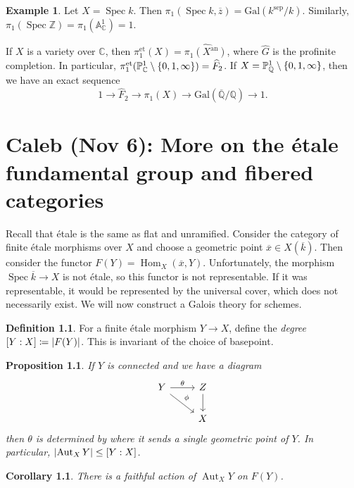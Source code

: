 \documentclass[leqno, openany]{memoir}
\newtheorem{cor}[thm]{Corollary}
\newtheorem{prop}[thm]{Proposition}
\theoremstyle{definition}
\newtheorem{defn}[thm]{Definition}
\newtheorem{exm}[thm]{Example}
\theoremstyle{remark}
\theoremstyle{plain}
\theoremstyle{definition}
\theoremstyle{remark}
\newcommand{\A}{\mathbb{A}}
\newcommand{\C}{\mathbb{C}}
\newcommand{\Z}{\mathbb{Z}}
\newcommand{\Q}{\mathbb{Q}}
\renewcommand{\P}{\mathbb{P}}
\newcommand{\mr}[1]{\mathrm{#1}}
\newcommand{\ol}[1]{\overline{#1}}
\newcommand{\wh}[1]{\widehat{#1}}
\DeclareMathOperator{\Hom}{Hom}
\DeclareMathOperator{\Aut}{Aut}
\DeclareMathOperator{\Spec}{Spec}
\begin{document}
\begin{exm}
    Let $X = \Spec k$. Then $\pi_1(\Spec k, \ol{z}) = \mr{Gal}(k^{\mr{sep}} / k)$. Similarly, $\pi_1(\Spec \Z) = \pi_1(\A^1_{\C}) = 1$.

    If $X$ is a variety over $\C$, then $\pi_1^{\mr{et}}(X) = \wh{\pi_1(X^{\mr{an}})}$, where $\wh{G}$ is the profinite completion. In particular, $\pi_1^{\mr{et}}(\P^1_{\C} \setminus \qty{0,1,\infty}) = \wh{F}_2$. If $X = \P^1_{\Q} \setminus \qty{0,1, \infty}$, then we have an exact sequence
    \[ 1 \to \wh{F}_2 \to \pi_1(X) \to \mr{Gal}(\ol{\Q}/\Q) \to 1. \]
\end{exm}

\chapter{Caleb (Nov 6): More on the \'etale fundamental group and fibered categories}%
\label{cha:caleb_nov_6_more_on_the_'etale_fundamental_group_and_fibered_categories}

Recall that \'etale is the same as flat and unramified. Consider the category of finite \'etale morphisms over $X$ and choose a geometric point $\ol{x} \in X(\ol{k})$. Then consider the functor $F(Y) = \Hom_X(\ol{x}, Y)$. Unfortunately, the morphism $\Spec \ol{k} \to X$ is not \'etale, so this functor is not representable. If it was representable, it would be represented by the universal cover, which does not necessarily exist. We will now construct a Galois theory for schemes.

\begin{defn}
    For a finite \'etale morphism $Y \to X$, define the \textit{degree} $[Y:X] \coloneqq \abs{F(Y)}$. This is invariant of the choice of basepoint.
\end{defn}

\begin{prop}
    If $Y$ is connected and we have a diagram
    \begin{equation*}
    \begin{tikzcd}
        Y \arrow{r}{\theta} \arrow{dr}{\phi} & Z \arrow{d} \\
                                             & X
    \end{tikzcd}
    \end{equation*}
    then $\theta$ is determined by where it sends a single geometric point of $Y$. In particular, $\abs{\Aut_X Y} \leq [Y:X]$.
\end{prop}

\begin{cor}
    There is a faithful action of $\Aut_X Y$ on $F(Y)$.
\end{cor}
\end{document}

